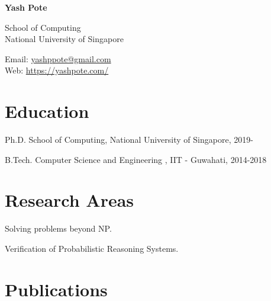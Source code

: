 \documentclass[12pt,letterpaper]{report}
\newcommand{\myname}{Yash Pote}
\newcommand{\namefont}[1]{{\normalfont\bfseries\Huge{#1}}}
\newcommand{\listitemspace}{0.15em}
\renewenvironment{itemize}
{\begin{list}{}{\setlength{\leftmargin}{0em}
            \setlength{\parskip}{0em}
            \setlength{\itemsep}{\listitemspace}
            \setlength{\parsep}{\listitemspace}}}
    {\end{list}}
\begin{document}
    \raggedright

    \namefont{\myname}

    \vspace{1em}
    \begin{minipage}[t]{0.68\textwidth}
        School of Computing \\
		National University of Singapore
    \end{minipage}
    \begin{minipage}[t]{0.31\textwidth}
        Email: \href{mailto:yashppote@gmail.com}{yashppote@gmail.com} \\
        Web: \href{https://yashpote.com/}{https://yashpote.com/}
    \end{minipage}
    \vspace{0.5em}



    \section*{Education}

    \begin{tablist}

        \item[Ph.D.] \tab School of Computing, National University of Singapore, 2019-

        \item[B.Tech.]  \tab Computer Science and Engineering , IIT - Guwahati, 2014-2018

    \end{tablist}


    \section*{Research Areas}

    \begin{itemize}

	\item Solving problems beyond NP.
	
	\item Verification of Probabilistic Reasoning Systems.

    \end{itemize}



    \section*{Publications}
\end{document}
